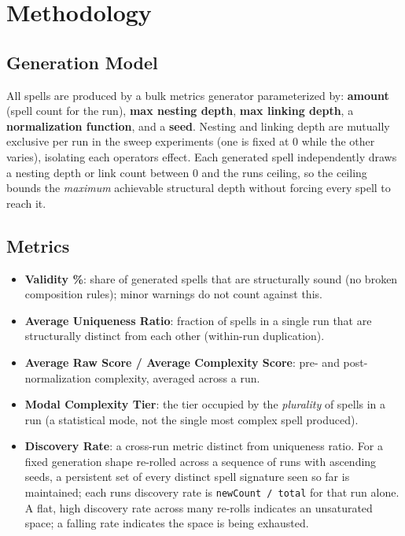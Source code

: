 \documentclass[
  10pt,
  twocolumn]{article}
\providecommand{\tightlist}{%
  \setlength{\itemsep}{0pt}\setlength{\parskip}{0pt}}
\begin{document}
\section{Methodology}\label{methodology}

\subsection{Generation Model}\label{generation-model}

All spells are produced by a bulk metrics generator parameterized by:
\textbf{amount} (spell count for the run), \textbf{max nesting depth},
\textbf{max linking depth}, a \textbf{normalization function}, and a
\textbf{seed}. Nesting and linking depth are mutually exclusive per run
in the sweep experiments (one is fixed at 0 while the other varies),
isolating each operator\textquotesingle s effect. Each generated spell
independently draws a nesting depth or link count between 0 and the
run\textquotesingle s ceiling, so the ceiling bounds the \emph{maximum}
achievable structural depth without forcing every spell to reach it.

\subsection{Metrics}\label{metrics}

\begin{itemize}
\tightlist
\item
  \textbf{Validity \%}: share of generated spells that are structurally
  sound (no broken composition rules); minor warnings do not count
  against this.
\item
  \textbf{Average Uniqueness Ratio}: fraction of spells in a single run
  that are structurally distinct from each other (within-run
  duplication).
\item
  \textbf{Average Raw Score / Average Complexity Score}: pre- and
  post-normalization complexity, averaged across a run.
\item
  \textbf{Modal Complexity Tier}: the tier occupied by the
  \emph{plurality} of spells in a run (a statistical mode, not the
  single most complex spell produced).
\item
  \textbf{Discovery Rate}: a cross-run metric distinct from uniqueness
  ratio. For a fixed generation shape re-rolled across a sequence of
  runs with ascending seeds, a persistent set of every distinct spell
  signature seen so far is maintained; each run\textquotesingle s
  discovery rate is \texttt{newCount\ /\ total} for that run alone. A
  flat, high discovery rate across many re-rolls indicates an
  unsaturated space; a falling rate indicates the space is being
  exhausted.
\end{itemize}
\end{document}
